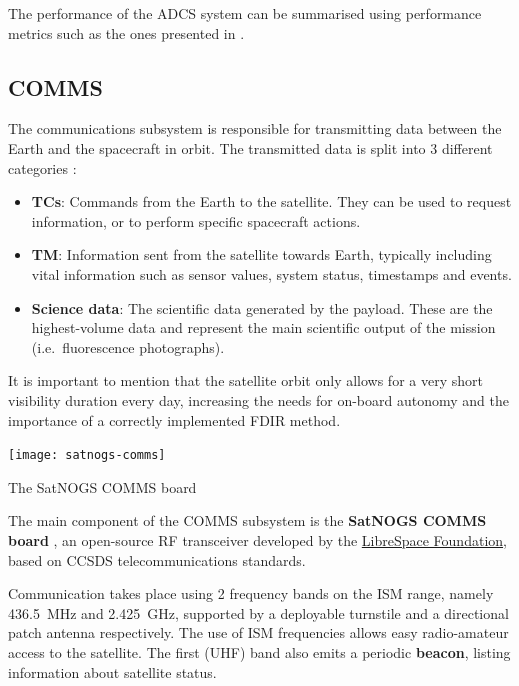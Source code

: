 \documentclass[a4paper,nobib]{tufte-book}
\begin{document}
The performance of the \ac{ADCS} system can be summarised using performance metrics such as the ones presented in .

\subsection{\acf{COMMS}}

The communications subsystem is responsible for transmitting data between the Earth and the spacecraft in orbit. The transmitted data is split into 3 different categories \autocite{DDJF_TTC}:
\begin{itemize}
	\item \textbf{\acfp{TC}}: Commands from the Earth to the satellite. They can be used to request information, or to perform specific spacecraft actions.
	\item \textbf{\acf{TM}}: Information sent from the satellite towards Earth, typically including vital information such as sensor values, system status, timestamps and events.
	\item \textbf{Science data}: The scientific data generated by the payload. These are the highest-volume data and represent the main scientific output of the mission (i.e.\ fluorescence photographs).
\end{itemize}

It is important to mention that the satellite orbit only allows for a very short visibility duration every day, increasing the needs for on-board autonomy and the importance of a correctly implemented \acs{FDIR} method.

\begin{marginfigure}
	\texttt{[image: satnogs-comms]}
	\caption{The SatNOGS COMMS board}
\end{marginfigure}

The main component of the \acs{COMMS} subsystem is the \textbf{SatNOGS COMMS board} \autocite{surligas_satnogscomms_2021}, an open-source \acs{RF} transceiver developed by the \href{https://libre.space/}{LibreSpace Foundation}, based on \acs{CCSDS} telecommunications standards.

Communication takes place using 2 frequency bands on the \acs{ISM} range, namely \SI{436.5}{\mega\hertz} and \SI{2.425}{\giga\hertz}, supported by a deployable turnstile and a directional patch antenna respectively. The use of \acs{ISM} frequencies allows easy radio-amateur access to the satellite. The first (\acs{UHF}) band also emits a periodic \textbf{beacon}, listing information about satellite status.
\end{document}
